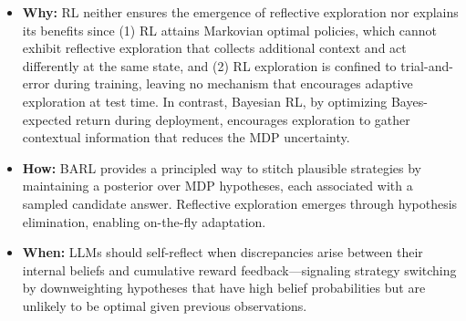 \vspace{0.15cm}
\begin{AIbox}{}
\begin{itemize}[leftmargin=0em]
\item \textbf{Why:} RL neither ensures the emergence of reflective exploration nor explains its benefits since (1) RL attains Markovian optimal policies, which cannot exhibit reflective exploration that collects additional context and act differently at the same state, and (2) RL exploration is confined to trial-and-error during training, leaving no mechanism that encourages adaptive exploration at test time. In contrast, Bayesian RL, by optimizing Bayes-expected return during deployment, encourages exploration to gather contextual information that reduces the MDP uncertainty.
\item \textbf{How:} BARL provides a principled way to stitch plausible strategies by maintaining a posterior over MDP hypotheses, each associated with a sampled candidate answer. Reflective exploration emerges through hypothesis elimination, enabling on-the-fly adaptation.
\item \textbf{When:} LLMs should self-reflect when discrepancies arise between their internal beliefs and cumulative reward feedback—signaling strategy switching by downweighting hypotheses that have high belief probabilities but are unlikely to be optimal given previous observations.
\end{itemize}
\end{AIbox}
